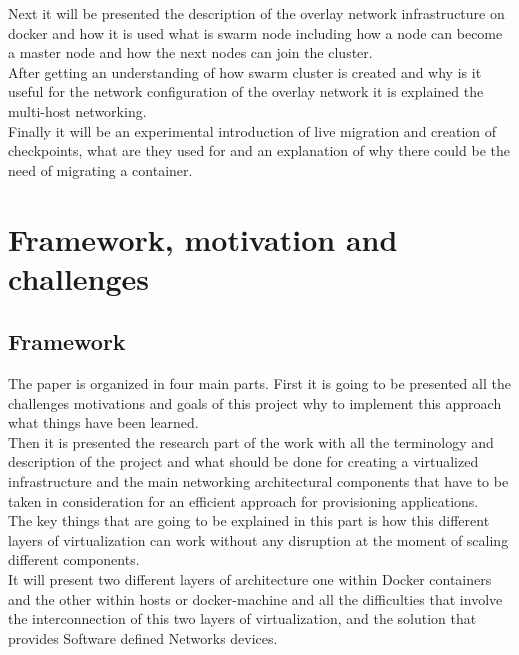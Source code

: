 Next it will be presented the description of the overlay network infrastructure on docker and how it is used what is swarm node including how a node can become a master node and how the next nodes can join the cluster.\\

After getting an understanding of how swarm cluster is created and why is it useful for the network configuration of the overlay network it is explained the multi-host networking.\\

Finally it will be an experimental introduction of live migration and creation of checkpoints, what are they used for and an explanation of why there could be the need of migrating a container.\\
 
\chapter{Framework, motivation and challenges} %

\label{ch:framework, motivation and challenges}

\section{Framework}

The paper is organized in four main parts. First it is going to be presented all the challenges motivations and goals of this project why to implement this approach what things have been learned.\\
 
Then it is presented the research part of the work with all the terminology and description of the project and what should be done for creating a virtualized infrastructure and the main networking architectural components that have to be taken in consideration for an efficient approach for provisioning applications.\\

The key things that are going to be explained in this part is how this different layers of virtualization can work without any disruption at the moment of scaling different components.\\

It will present two different layers of architecture one within Docker containers and the other within hosts or docker-machine and all the difficulties that involve the interconnection of this two layers of virtualization, and the solution that provides Software defined Networks devices.\\

